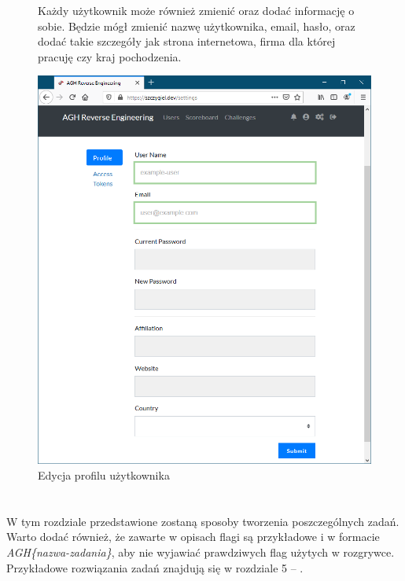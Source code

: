 \documentclass[polish,12pt]{aghthesis}
\begin{document}
\begin{figure}[ht]
    Każdy użytkownik może również zmienić oraz dodać informację o sobie.
    Będzie mógł zmienić nazwę użytkownika, email, hasło, oraz dodać
    takie szczegóły jak strona internetowa, firma dla której pracuję czy kraj pochodzenia.

    \vspace{1cm}

    \centering
    \includegraphics[width=14cm]{szczygiel_dev_settings}
    \caption{Edycja profilu użytkownika}
    \label{fig:szczygiel_dev_settings}
\end{figure}

\clearpage

\section{\SectionTitleRealizationAspects}
\label{sec:wybrane-aspekty-realizacji}

W tym rozdziale przedstawione zostaną sposoby tworzenia poszczególnych zadań.
Warto dodać również, że zawarte w opisach flagi są przykładowe i w formacie
\emph{AGH\{nazwa-zadania\}}, aby nie wyjawiać prawdziwych flag użytych w rozgrywce.
Przykładowe rozwiązania zadań znajdują się w rozdziale 5 -- .
\end{document}
